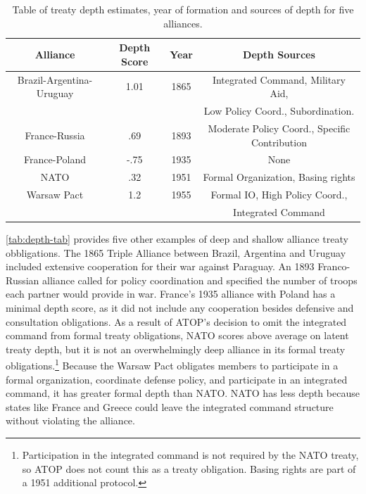 \documentclass[12pt]{article}
\begin{document}
\begin{table}[hbt!]
\begin{center}
\begin{tabular}{cccc}
   Alliance  & Depth Score & Year & Depth Sources  \\
\hline
Brazil-Argentina-Uruguay & 1.01 & 1865 & Integrated Command, Military Aid, \\
                         &      &      &  Low Policy Coord., Subordination. \\
France-Russia   & .69 & 1893 & Moderate Policy Coord., Specific Contribution \\
 France-Poland   & -.75  & 1935  & None\\
 NATO & .32 & 1951 & Formal Organization, Basing rights \\ 
 Warsaw Pact & 1.2  & 1955 &  Formal IO, High Policy Coord., \\
             &      &      & Integrated Command  \\ 
\hline
\end{tabular}
\caption{Table of treaty depth estimates, year of formation and sources of depth for five alliances. }
\label{tab:depth-tab}
\end{center} 
\end{table}


\autoref{tab:depth-tab} provides five other examples of deep and shallow alliance treaty obbligations.  
The 1865 Triple Alliance between Brazil, Argentina and Uruguay included extensive cooperation for their war against Paraguay. 
An 1893 Franco-Russian alliance called for policy coordination and specified the number of troops each partner would provide in war. 
France's 1935 alliance with Poland has a minimal depth score, as it did not include any cooperation besides defensive and consultation obligations. 
As a result of ATOP's decision to omit the integrated command from formal treaty obligations, NATO scores above average on latent treaty depth, but it is not an overwhelmingly deep alliance in its formal treaty obligations.\footnote{Participation in the integrated command is not required by the NATO treaty, so ATOP does not count this as a treaty obligation. Basing rights are part of a 1951 additional protocol.}
Because the Warsaw Pact obligates members to participate in a formal organization, coordinate defense policy, and participate in an integrated command, it has greater formal depth than NATO. 
NATO has less depth because states like France and Greece could leave the integrated command structure without violating the alliance. 
\end{document}

